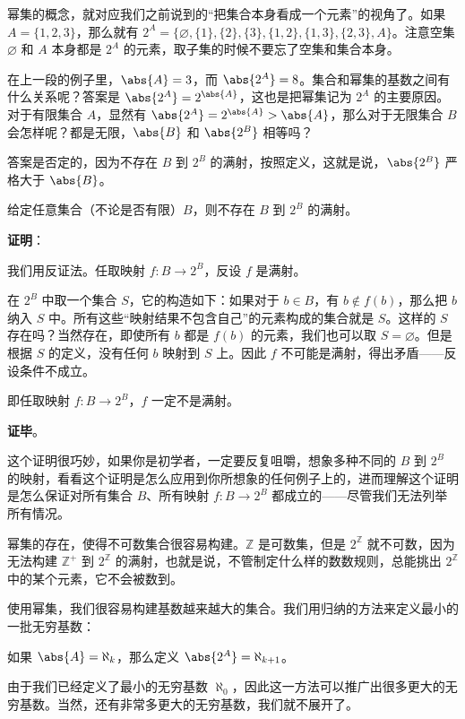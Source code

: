 幂集的概念，就对应我们之前说到的“把集合本身看成一个元素”的视角了。如果 $A=\{1,2,3\}$，那么就有 $2^A=\{\varnothing, \{1\}, \{2\}, \{3\}, \{1,2\}, \{1,3\}, \{2,3\}, A\}$。注意空集 $\varnothing$ 和 $A$ 本身都是 $2^A$ 的元素，取子集的时候不要忘了空集和集合本身。

在上一段的例子里，$\abs{A}=3$，而 $\abs{2^A}=8$。集合和幂集的基数之间有什么关系呢？答案是 $\abs{2^A}=2^{\abs{A}}$，这也是把幂集记为 $2^A$ 的主要原因。对于有限集合 $A$，显然有 $\abs{2^A}=2^{\abs{A}}>\abs{A}$，那么对于无限集合 $B$ 会怎样呢？都是无限，$\abs{B}$ 和 $\abs{2^B}$ 相等吗？

答案是否定的，因为不存在 $B$ 到 $2^B$ 的满射，按照定义，这就是说，$\abs{2^B}$ 严格大于 $\abs{B}$。

\begin{theorem}{}
给定任意集合（不论是否有限）$B$，则不存在 $B$ 到 $2^B$ 的满射。
\end{theorem}

\textbf{证明}：

我们用反证法。任取映射 $f:B\rightarrow 2^B$，反设 $f$ 是满射。

在 $2^B$ 中取一个集合 $S$，它的构造如下：如果对于 $b\in B$，有 $b\not\in f(b)$，那么把 $b$ 纳入 $S$ 中。所有这些“映射结果不包含自己”的元素构成的集合就是 $S$。这样的 $S$ 存在吗？当然存在，即使所有 $b$ 都是 $f(b)$ 的元素，我们也可以取 $S=\varnothing$。但是根据 $S$ 的定义，没有任何 $b$ 映射到 $S$ 上。因此 $f$ 不可能是满射，得出矛盾——反设条件不成立。

即任取映射 $f:B\rightarrow 2^B$，$f$ 一定不是满射。

\textbf{证毕}。

这个证明很巧妙，如果你是初学者，一定要反复咀嚼，想象多种不同的 $B$ 到 $2^B$ 的映射，看看这个证明是怎么应用到你所想象的任何例子上的，进而理解这个证明是怎么保证对所有集合 $B$、所有映射 $f:B\rightarrow 2^B$ 都成立的——尽管我们无法列举所有情况。

幂集的存在，使得不可数集合很容易构建。$\mathbb{Z}$ 是可数集，但是 $2^{\mathbb{Z}}$ 就不可数，因为无法构建 $\mathbb{Z}^+$ 到 $2^{\mathbb{Z}}$ 的满射，也就是说，不管制定什么样的数数规则，总能挑出 $2^{\mathbb{Z}}$ 中的某个元素，它不会被数到。

使用幂集，我们很容易构建基数越来越大的集合。我们用归纳的方法来定义最小的一批无穷基数：
\begin{definition}{}
如果 $\abs{A}=\aleph_k$，那么定义 $\abs{2^A}=\aleph_{k+1}$。
\end{definition}
由于我们已经定义了最小的无穷基数 $\aleph_0$，因此这一方法可以推广出很多更大的无穷基数。当然，还有非常多更大的无穷基数，我们就不展开了。


